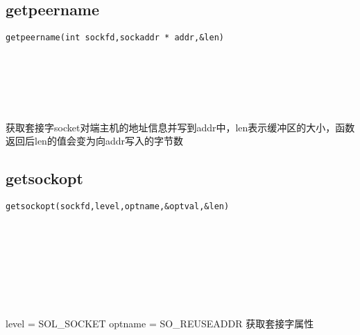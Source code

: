 \documentclass[10pt,a4paper]{article}
\begin{document}
\subsection{getpeername}
\begin{spacing}{2.0}
\lstset{language=C,numbers=none}
\begin{lstlisting}
getpeername(int sockfd,sockaddr * addr,&len)
\end{lstlisting}
{\large\color[rgb]{0.2,0.4,0.6}{sockfd:}} \\
{\large\color[rgb]{0.2,0.4,0.6}{addr:}} \\
{\large\color[rgb]{0.2,0.4,0.6}{\&len:}}
\paragraph{ \ \ }获取套接字socket对端主机的地址信息并写到addr中，len表示缓冲区的大小，函数返回后len的值会变为向addr写入的字节数
\end{spacing}

\subsection{getsockopt}
\begin{spacing}{2.0}
\lstset{language=C,numbers=none}
\begin{lstlisting}
getsockopt(sockfd,level,optname,&optval,&len)
\end{lstlisting}
{\large\color[rgb]{0.2,0.4,0.6}{sockfd:}} \\
{\large\color[rgb]{0.2,0.4,0.6}{level:}} \\
{\large\color[rgb]{0.2,0.4,0.6}{optname:}} \\
{\large\color[rgb]{0.2,0.4,0.6}{\&optval:}} \\
{\large\color[rgb]{0.2,0.4,0.6}{\&len:}}
\paragraph{ \ \ }level = SOL\_SOCKET optname = SO\_REUSEADDR 获取套接字属性
\end{spacing}
\end{document}
